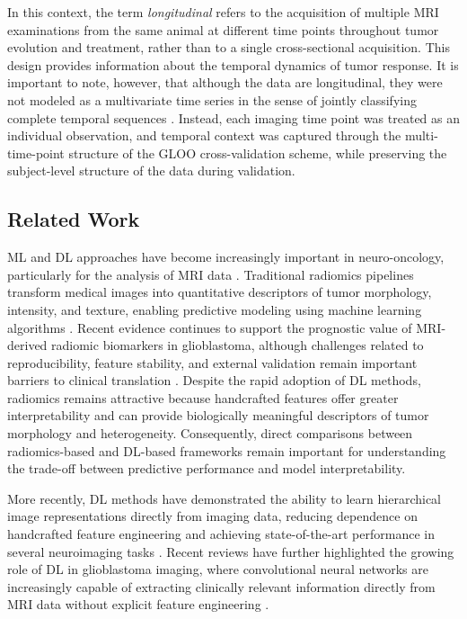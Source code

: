 \documentclass{article}
\begin{document}
In this context, the term \textit{longitudinal} refers to the acquisition of multiple MRI examinations from the same animal at different time points throughout tumor evolution and treatment, rather than to a single cross-sectional acquisition. This design provides information about the temporal dynamics of tumor response. It is important to note, however, that although the data are longitudinal, they were not modeled as a multivariate time series in the sense of jointly classifying complete temporal sequences \cite{Prinzi2024}. Instead, each imaging time point was treated as an individual observation, and temporal context was captured through the multi-time-point structure of the GLOO cross-validation scheme, while preserving the subject-level structure of the data during validation.

\subsection*{Related Work}
ML and DL approaches have become increasingly important in neuro-oncology, particularly for the analysis of MRI data \cite{Pitarch24}. Traditional radiomics pipelines transform medical images into quantitative descriptors of tumor morphology, intensity, and texture, enabling predictive modeling using machine learning algorithms \cite{kumar2012radiomics,pyradiomics}. Recent evidence continues to support the prognostic value of MRI-derived radiomic biomarkers in glioblastoma, although challenges related to reproducibility, feature stability, and external validation remain important barriers to clinical translation \cite{PMID:38668068}. Despite the rapid adoption of DL methods, radiomics remains attractive because handcrafted features offer greater interpretability and can provide biologically meaningful descriptors of tumor morphology and heterogeneity. Consequently, direct comparisons between radiomics-based and DL-based frameworks remain important for understanding the trade-off between predictive performance and model interpretability.

More recently, DL methods have demonstrated the ability to learn hierarchical image representations directly from imaging data, reducing dependence on handcrafted feature engineering and achieving state-of-the-art performance in several neuroimaging tasks \cite{Hosny2018,Shen2017,Tran2021,Dorfner2025}. Recent reviews have further highlighted the growing role of DL in glioblastoma imaging, where convolutional neural networks are increasingly capable of extracting clinically relevant information directly from MRI data without explicit feature engineering \cite{biomedicines12081878}.
\end{document}
